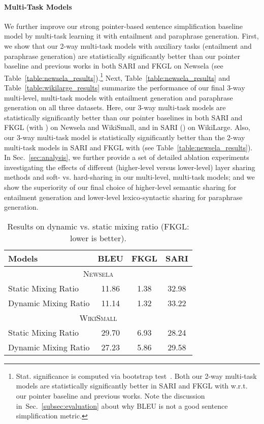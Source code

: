 \documentclass[11pt]{article}
\def\secref#1{Sec.~\ref{#1}}
\begin{document}
\paragraph{Multi-Task Models}
We further improve our strong pointer-based sentence simplification baseline model by multi-task learning it with entailment and paraphrase generation. First, we show that our 2-way multi-task models with auxiliary tasks (entailment and paraphrase generation) are statistically significantly better than our pointer baseline and previous works in both SARI and FKGL on Newsela (see Table~\ref{table:newsela_results}).\footnote{Stat. significance is computed via bootstrap test~\cite{noreen1989computer,efron1994introduction}. Both our 2-way multi-task models are statistically significantly better in SARI and FKGL with  w.r.t. our pointer baseline and previous works. Note the discussion in~\secref{subsec:evaluation} about why BLEU is not a good sentence simplification metric.} 
Next, Table~\ref{table:newsela_results} and Table~\ref{table:wikilarge_results} summarize the performance of our final 3-way multi-level, multi-task models with entailment generation and paraphrase generation on all three datasets.
Here, our 3-way multi-task models are statistically significantly better than our pointer baselines in both SARI and FKGL (with ) on Newsela and WikiSmall, and in SARI () on WikiLarge.
Also, our 3-way multi-task model is statistically significantly better than the 2-way multi-task models in SARI and FKGL with  (see Table~\ref{table:newsela_results}). In Sec.~\ref{sec:analysis}, we further provide a set of detailed ablation experiments investigating the effects of different (higher-level versus lower-level) layer sharing methods and soft- vs. hard-sharing in our multi-level, multi-task models; and we show the superiority of our final choice of higher-level semantic sharing for entailment generation and lower-level lexico-syntactic sharing for paraphrase generation.


\begin{wraptable}[8]{r}{0.45\textwidth}
\begin{small}
\begin{center}
\vspace{-4pt}
\begin{tabular}{|l|c|c|c|}
\hline
Models & BLEU & FKGL & SARI \\
\hline
\multicolumn{4}{|c|}{\textsc{Newsela}}\\
\hline
Static Mixing Ratio  & 11.86 & 1.38 & 32.98 \\
Dynamic Mixing Ratio & 11.14 & 1.32  & 33.22 \\
\hline
\multicolumn{4}{|c|}{\textsc{WikiSmall}}\\
\hline
Static Mixing Ratio  & 29.70 &  6.93 & 28.24 \\
Dynamic Mixing Ratio & 27.23 &  5.86 & 29.58 \\
\hline
\end{tabular}
\end{center}
\vspace{-12pt}
\caption{Results on dynamic vs. static mixing ratio (FKGL: lower is better).}
\label{table:dynamic-mixing-results}
\end{small}
\end{wraptable}
\end{document}
